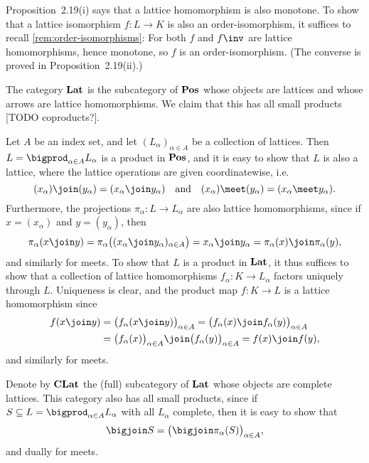 \documentclass[article, a4paper, 11pt, oneside]{memoir}
\numberwithin{equation}{chapter}
\theoremstyle{nonumberplain}
\begin{document}
\begin{remarkbreak}
    Proposition~2.19(i) says that a lattice homomorphism is also monotone. To show that a lattice isomorphism $f \colon L \to K$ is also an order-isomorphism, it suffices to recall \cref{rem:order-isomorphisms}: For both $f$ and $f\inv$ are lattice homomorphisms, hence monotone, so $f$ is an order-isomorphism. (The converse is proved in Proposition~2.19(ii).)
\end{remarkbreak}


\begin{remarkbreak}
    The category $\mathbf{Lat}$ is the subcategory of $\mathbf{Pos}$ whose objects are lattices and whose arrows are lattice homomorphisms. We claim that this has all small products [TODO coproducts?].

    Let $A$ be an index set, and let $(L_\alpha)_{\alpha \in A}$ be a collection of lattices. Then $L = \bigprod_{\alpha \in A} L_\alpha$ is a product in $\mathbf{Pos}$, and it is easy to show that $L$ is also a lattice, where the lattice operations are given coordinatewise, i.e.
    \begin{equation*}
        (x_\alpha) \join (y_\alpha)
            = (x_\alpha \join y_\alpha)
        \quad \text{and} \quad
        (x_\alpha) \meet (y_\alpha)
            = (x_\alpha \meet y_\alpha).
    \end{equation*}
    Furthermore, the projections $\pi_\alpha \colon L \to L_\alpha$ are also lattice homomorphisms, since if $x = (x_\alpha)$ and $y = (y_\alpha)$, then
    \begin{equation*}
        \pi_\alpha(x \join y)
            = \pi_\alpha \bigl( (x_\alpha \join y_\alpha)_{\alpha \in A} \bigr)
            = x_\alpha \join y_\alpha
            = \pi_\alpha(x) \join \pi_\alpha(y),
    \end{equation*}
    and similarly for meets. To show that $L$ is a product in $\mathbf{Lat}$, it thus suffices to show that a collection of lattice homomorphisms $f_\alpha \colon K \to L_\alpha$ factors uniquely through $L$. Uniqueness is clear, and the product map $f \colon K \to L$ is a lattice homomorphism since
    \begin{align*}
        f(x \join y)
            &= \bigl( f_\alpha(x \join y) \bigr)_{\alpha \in A}
             = \bigl( f_\alpha(x) \join f_\alpha(y) \bigr)_{\alpha \in A} \\
            &= \bigl( f_\alpha(x) \bigr)_{\alpha \in A} \join \bigl( f_\alpha(y) \bigr)_{\alpha \in A}
             = f(x) \join f(y),
    \end{align*}
    and similarly for meets.

    Denote by $\mathbf{CLat}$ the (full) subcategory of $\mathbf{Lat}$ whose objects are complete lattices. This category also has all small products, since if $S \subseteq L = \bigprod_{\alpha \in A} L_\alpha$ with all $L_\alpha$ complete, then it is easy to show that
    \begin{equation*}
        \bigjoin S
            = \bigl( \bigjoin \pi_\alpha(S) \bigr)_{\alpha \in A},
    \end{equation*}
    and dually for meets.
\end{remarkbreak}
\end{document}

